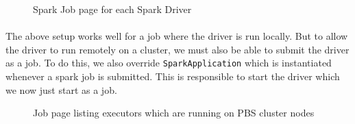 \begin{figure}[h]
    \centering
    \caption{Spark Job page for each Spark Driver}
\end{figure}

\paragraph{}
The above setup works well for a job where the \gls{driver} is run locally. But
to allow the \gls{driver} to run remotely on a cluster, we must also be able to
submit the \gls{driver} as a  job. To do this, we also override
\texttt{SparkApplication} which is instantiated whenever a \gls{spark} job is
submitted. This is responsible to start the \gls{driver} which we now just start
as a  job.

\begin{figure}[h]
    \centering
    \caption{Job page listing executors which are running on PBS cluster nodes}
\end{figure}


